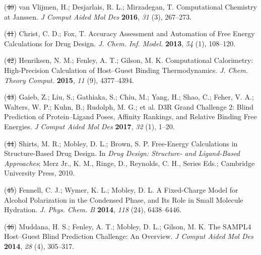 \documentclass[11pt,notitlepage]{article}
\providecommand{\DIFaddtex}[1]{{\protect\color{blue}\uwave{#1}}} %
\providecommand{\DIFdeltex}[1]{{\protect\color{red}\sout{#1}}}                      %
\providecommand{\DIFaddbegin}{} %
\providecommand{\DIFaddend}{} %
\providecommand{\DIFdelbegin}{} %
\providecommand{\DIFdelend}{} %
\providecommand{\DIFadd}[1]{\texorpdfstring{\DIFaddtex{#1}}{#1}} %
\providecommand{\DIFdel}[1]{\texorpdfstring{\DIFdeltex{#1}}{}} %
\newcommand{\DIFscaledelfig}{0.5}
\newlength{\DIFdelgraphicswidth} %
\newlength{\DIFdelgraphicsheight} %
\newcommand{\DIFaddincludegraphics}[2][]{{\color{blue}\fbox{\DIFOincludegraphics[#1]{#2}}}} %
\newcommand{\DIFdelincludegraphics}[2][]{%
\sbox{\DIFdelgraphicsbox}{\DIFOincludegraphics[#1]{#2}}%
\settoboxwidth{\DIFdelgraphicswidth}{\DIFdelgraphicsbox} %
\settoboxtotalheight{\DIFdelgraphicsheight}{\DIFdelgraphicsbox} %
\scalebox{\DIFscaledelfig}{%
\parbox[b]{\DIFdelgraphicswidth}{\usebox{\DIFdelgraphicsbox}\\[-\baselineskip] \rule{\DIFdelgraphicswidth}{0em}}\llap{\resizebox{\DIFdelgraphicswidth}{\DIFdelgraphicsheight}{%
\setlength{\unitlength}{\DIFdelgraphicswidth}%
\begin{picture}(1,1)%
\thicklines\linethickness{2pt} %
{\color[rgb]{1,0,0}\put(0,0){\framebox(1,1){}}}%
{\color[rgb]{1,0,0}\put(0,0){\line( 1,1){1}}}%
{\color[rgb]{1,0,0}\put(0,1){\line(1,-1){1}}}%
\end{picture}%
}\hspace*{3pt}}} %
} %
\DeclareRobustCommand{\DIFaddbegin}{\DIFOaddbegin \let\includegraphics\DIFaddincludegraphics} %
\DeclareRobustCommand{\DIFaddend}{\DIFOaddend \let\includegraphics\DIFOincludegraphics} %
\DeclareRobustCommand{\DIFdelbegin}{\DIFOdelbegin \let\includegraphics\DIFdelincludegraphics} %
\DeclareRobustCommand{\DIFdelend}{\DIFOaddend \let\includegraphics\DIFOincludegraphics} %
\begin{document}
\leavevmode\hypertarget{ref-1FiDpP1LR}{}%
(\DIFdelbegin \DIFdel{40}\DIFdelend \DIFaddbegin \DIFadd{48}\DIFaddend ) van Vlijmen, H.; Desjarlais, R. L.; Mirzadegan, T. Computational
Chemistry at Janssen. \emph{J Comput Aided Mol Des} \textbf{2016},
\emph{31} (3), 267--273.

\leavevmode\hypertarget{ref-1BwXH3GFO}{}%
(\DIFdelbegin \DIFdel{41}\DIFdelend \DIFaddbegin \DIFadd{49}\DIFaddend ) Christ, C. D.; Fox, T. Accuracy Assessment and Automation of Free
Energy Calculations for Drug Design. \emph{J. Chem. Inf. Model.}
\textbf{2013}, \emph{54} (1), 108--120.

\leavevmode\hypertarget{ref-1935a9V0d}{}%
(\DIFdelbegin \DIFdel{42}\DIFdelend \DIFaddbegin \DIFadd{50}\DIFaddend ) Henriksen, N. M.; Fenley, A. T.; Gilson, M. K. Computational
Calorimetry: High-Precision Calculation of Host--Guest Binding
Thermodynamics. \emph{J. Chem. Theory Comput.} \textbf{2015}, \emph{11}
(9), 4377--4394.

\leavevmode\hypertarget{ref-LWd10vQy}{}%
(\DIFdelbegin \DIFdel{43}\DIFdelend \DIFaddbegin \DIFadd{51}\DIFaddend ) Gaieb, Z.; Liu, S.; Gathiaka, S.; Chiu, M.; Yang, H.; Shao, C.;
Feher, V. A.; Walters, W. P.; Kuhn, B.; Rudolph, M. G.; et al. D3R Grand
Challenge 2: Blind Prediction of Protein--Ligand Poses, Affinity
Rankings, and Relative Binding Free Energies. \emph{J Comput Aided Mol
Des} \textbf{2017}, \emph{32} (1), 1--20.

\leavevmode\hypertarget{ref-fC0t6Cy1}{}%
(\DIFdelbegin \DIFdel{44}\DIFdelend \DIFaddbegin \DIFadd{52}\DIFaddend ) Shirts, M. R.; Mobley, D. L.; Brown, S. P. Free-Energy Calculations
in Structure-Based Drug Design. In \emph{Drug Design: Structure- and
Ligand-Based Approaches}; Merz Jr., K. M., Ringe, D., Reynolds, C. H.,
Series Eds.; Cambridge University Press, 2010.

\leavevmode\hypertarget{ref-LOjcxYqt}{}%
(\DIFdelbegin \DIFdel{45}\DIFdelend \DIFaddbegin \DIFadd{53}\DIFaddend ) Fennell, C. J.; Wymer, K. L.; Mobley, D. L. A Fixed-Charge Model
for Alcohol Polarization in the Condensed Phase, and Its Role in Small
Molecule Hydration. \emph{J. Phys. Chem. B} \textbf{2014}, \emph{118}
(24), 6438--6446.

\leavevmode\hypertarget{ref-GA1AFcUw}{}%
(\DIFdelbegin \DIFdel{46}\DIFdelend \DIFaddbegin \DIFadd{54}\DIFaddend ) Muddana, H. S.; Fenley, A. T.; Mobley, D. L.; Gilson, M. K. The
SAMPL4 Host--Guest Blind Prediction Challenge: An Overview. \emph{J
Comput Aided Mol Des} \textbf{2014}, \emph{28} (4), 305--317.
\end{document}
